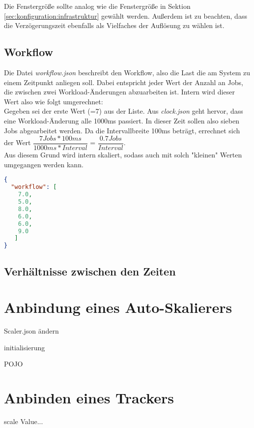 Die Fenstergröße sollte analog wie die Fenstergröße in Sektion \ref{sec:konfiguration:infrastruktur} gewählt werden. Außerdem ist zu beachten, dass die Verzögerungszeit ebenfalls als Vielfaches der Auflösung zu wählen ist.

\subsection{Workflow}
Die Datei \textit{workflow.json} beschreibt den Workflow, also die Last die am System zu einem Zeitpunkt anliegen soll. Dabei entspricht jeder Wert der Anzahl an Jobs, die zwischen zwei Workload-Änderungen abzuarbeiten ist. Intern wird dieser Wert also wie folgt umgerechnet:\\
Gegeben sei der erste Wert (=7) aus der Liste. Aus \textit{clock.json} geht hervor, dass eine Workload-Änderung alle 1000ms passiert. In dieser Zeit sollen also sieben Jobs abgearbeitet werden. Da die Intervallbreite 100ms beträgt, errechnet sich der Wert $\dfrac{7 Jobs * 100ms}{1000ms * Interval}$ = $\dfrac{0.7Jobs}{Interval}$. \\

\vspace{0.2cm}
\noindent
Aus diesem Grund wird intern skaliert, sodass auch mit solch "kleinen" Werten umgegangen werden kann.


\begin{lstlisting}[language=json,firstnumber=1]
{
  "workflow": [
    7.0,
    5.0,
    8.0,
    6.0,
    6.0,
    9.0 
   ]
}
\end{lstlisting}

\subsection{Verhältnisse zwischen den Zeiten}



\section{Anbindung eines Auto-Skalierers}
\label{sec:Konfiguration:AnbindungScaler}

Scaler.json ändern

initialisierung 

POJO

\section{Anbinden eines Trackers}

scale Value...


